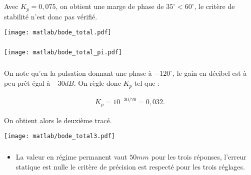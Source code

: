 \begin{multicols}{2}
\subparagraph{}\textit{}%

Avec $K_p=0,075$, on obtient une marge de phase de $35^{\circ}<60^{\circ}$, le critère de stabilité n'est donc pas vérifié.

\begin{center}
\texttt{[image: matlab/bode\_total.pdf]}
\end{center}

\subparagraph{}%

\begin{center}
\texttt{[image: matlab/bode\_total\_pi.pdf]}
\end{center}

\subparagraph{}\textit{}%

On note qu'en la pulsation donnant une phase à $-120^{\circ}$, le gain en décibel est à peu prêt égal à $-30dB$. On règle donc $K_p$ tel que :

\begin{align*}
\boxed{
K_p=10^{-30/20}=0,032.
}
\end{align*}

On obtient alors le deuxième tracé.

\begin{center}
\texttt{[image: matlab/bode\_total3.pdf]}
\end{center} 


\subparagraph{}\textit{}%

\begin{itemize}
\item La valeur en régime permanent vaut $50mm$ pour les trois réponses, l'erreur statique est nulle le critère de précision
est respecté pour les trois réglages.


\end{itemize}
\end{multicols}
